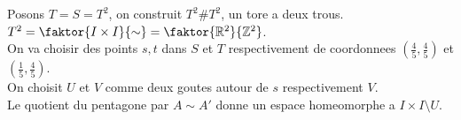 \documentclass[../main.tex]{subfiles}
\begin{document}
\begin{exemple}
Posons $T=S=T^{2}$, on construit $T^{2}\# T^{2}$, un tore a deux trous.\\
$ T^{2}= \faktor { I\times I} { \sim}  = \faktor { \mathbb{R}^{2}} { \mathbb{Z}^{2}} $.\\
On va choisir des points $s,t$ dans $S$ et $T$ respectivement de coordonnees $ ( \frac{4}{5},\frac{4}{5}) $ et $ ( \frac{1}{5}, \frac{4}{5}) $.\\
On choisit $ U$ et $V$ comme deux goutes autour de $s$ respectivement $V$.\\
Le quotient du pentagone par $ A\sim A'$ donne un espace homeomorphe a $ I\times I \setminus U$.
\end{exemple}
\end{document}
